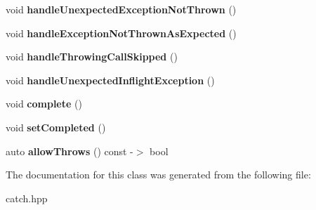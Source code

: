 \begin{DoxyCompactItemize}
\item 
void {\bfseries handle\+Unexpected\+Exception\+Not\+Thrown} ()\hypertarget{classCatch_1_1AssertionHandler_a7764d0adb6ed5eeb10964f6abc02fab1}{}\label{classCatch_1_1AssertionHandler_a7764d0adb6ed5eeb10964f6abc02fab1}

\item 
void {\bfseries handle\+Exception\+Not\+Thrown\+As\+Expected} ()\hypertarget{classCatch_1_1AssertionHandler_a51e4936e3af43b74690cedae6d2e297a}{}\label{classCatch_1_1AssertionHandler_a51e4936e3af43b74690cedae6d2e297a}

\item 
void {\bfseries handle\+Throwing\+Call\+Skipped} ()\hypertarget{classCatch_1_1AssertionHandler_a67a194d5518f307c4a16faa03a7f7442}{}\label{classCatch_1_1AssertionHandler_a67a194d5518f307c4a16faa03a7f7442}

\item 
void {\bfseries handle\+Unexpected\+Inflight\+Exception} ()\hypertarget{classCatch_1_1AssertionHandler_aa2504dad6a91f3645e5f52c932c11270}{}\label{classCatch_1_1AssertionHandler_aa2504dad6a91f3645e5f52c932c11270}

\item 
void {\bfseries complete} ()\hypertarget{classCatch_1_1AssertionHandler_a878a9eb828d8a1863c8dcb6575f6f40e}{}\label{classCatch_1_1AssertionHandler_a878a9eb828d8a1863c8dcb6575f6f40e}

\item 
void {\bfseries set\+Completed} ()\hypertarget{classCatch_1_1AssertionHandler_a6756bd5395c0ddd28764a9fb4612d5e4}{}\label{classCatch_1_1AssertionHandler_a6756bd5395c0ddd28764a9fb4612d5e4}

\item 
auto {\bfseries allow\+Throws} () const -\/$>$ bool\hypertarget{classCatch_1_1AssertionHandler_a193bb3999494c46457f3059184c6b251}{}\label{classCatch_1_1AssertionHandler_a193bb3999494c46457f3059184c6b251}

\end{DoxyCompactItemize}


The documentation for this class was generated from the following file\+:\begin{DoxyCompactItemize}
\item 
catch.\+hpp\end{DoxyCompactItemize}
